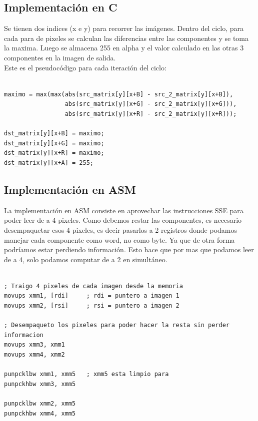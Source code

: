 \documentclass[10pt,a4paper,spanish]{article}
\begin{document}
\subsection{Implementación en C}

Se tienen dos indices (x e y) para recorrer las imágenes. Dentro del ciclo, para cada para de pixeles se calculan las diferencias entre las componentes y se toma la maxima. Luego se almacena 255 en alpha y el valor calculado en las otras 3 componentes en la imagen de salida. \\

Este es el pseudocódigo para cada iteración del ciclo:

\begin{codesnippet}
\begin{verbatim}

maximo = max(max(abs(src_matrix[y][x+B] - src_2_matrix[y][x+B]),
                 abs(src_matrix[y][x+G] - src_2_matrix[y][x+G])),
                 abs(src_matrix[y][x+R] - src_2_matrix[y][x+R]));

dst_matrix[y][x+B] = maximo;
dst_matrix[y][x+G] = maximo;
dst_matrix[y][x+R] = maximo;
dst_matrix[y][x+A] = 255;

\end{verbatim}
\end{codesnippet}

\subsection{Implementación en ASM}

La implementación en ASM consiste en aprovechar las instrucciones SSE para poder leer de a 4 pixeles. Como debemos restar las componentes, es necesario desempaquetar esos 4 pixeles, es decir pasarlos a 2 registros donde podamos manejar cada componente como word, no como byte. Ya que de otra forma podríamos estar perdiendo información. Esto hace que por mas que podamos leer de a 4, solo podamos computar de a 2 en simultáneo.

\begin{codesnippet}
\begin{verbatim}

; Traigo 4 pixeles de cada imagen desde la memoria
movups xmm1, [rdi]     ; rdi = puntero a imagen 1
movups xmm2, [rsi]     ; rsi = puntero a imagen 2

; Desempaqueto los pixeles para poder hacer la resta sin perder informacion
movups xmm3, xmm1
movups xmm4, xmm2

punpcklbw xmm1, xmm5   ; xmm5 esta limpio para 
punpckhbw xmm3, xmm5

punpcklbw xmm2, xmm5
punpckhbw xmm4, xmm5

\end{verbatim}
\end{codesnippet}
\end{document}
